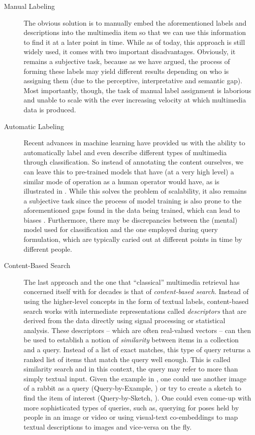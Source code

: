 \begin{description}
    \item[Manual Labeling] The obvious solution is to manually embed the aforementioned labels and descriptions into the multimedia item so that we can use this information to find it at a later point in time. While as of today, this approach is still widely used, it comes with two important disadvantages. Obviously, it remains a subjective task, because as we have argued, the process of forming these labels may yield different results depending on who is assigning them (due to the perceptive, interpretative and semantic gap). Most importantly, though, the task of manual label assignment is laborious and unable to scale with the ever increasing velocity at which multimedia data is produced.
    \item[Automatic Labeling] Recent advances in machine learning have provided us with the ability to automatically label \cite{Redmon:2016You} and even describe \cite{Radford:2021Learning} different types of multimedia through classification. So instead of annotating the content ourselves, we can leave this to pre-trained models that have (at a very high level) a similar mode of operation as a human operator would have, as is illustrated in . While this solves the problem of scalability, it also remains a subjective task since the process of model training is also prone to the aforementioned gaps found in the data being trained, which can lead to biases \cite{Baer2017:Controlling}. Furthermore, there may be discrepancies between the (mental) model used for classification and the one employed during query formulation, which are typically caried out at different points in time by different people.
    \item[Content-Based Search] The last approach and the one that ``classical'' multimedia retrieval has concerned itself with for decades is that of \emph{content-based search}. Instead of using the higher-level concepts in the form of textual labels, content-based search works with intermediate representations called \emph{descriptors} that are derived from the data directly using signal processing or statistical analysis. These descriptors -- which are often real-valued vectors \cite{Zezula:2006Similarity} -- can then be used to establish a notion of \emph{similarity} between items in a collection and a query. Instead of a list of exact matches, this type of query returns a ranked list of items that match the query well enough. This is called similarity search \cite{Blanken:2007multimedia} and in this context, the query may refer to more than simply textual input. Given the example in , one could use another image of a rabbit as a query (Query-by-Example, \cite{Kelly:1995Query}) or try to create a sketch to find the item of interest (Query-by-Sketch, \cite{Sciascio:1999Content}). One could even come-up with more sophisticated types of queries, such as, querying for poses held by people in an image or video \cite{Heller:2022Multi} or using visual-text co-embeddings \cite{Radford:2021Learning,Spiess:2022Multi} to map textual descriptions to images and vice-versa on the fly.
\end{description}

